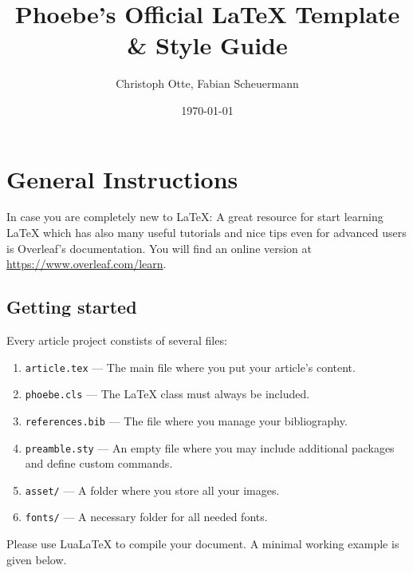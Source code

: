 \documentclass[language=english]{phoebe}
\title{Phoebe's Official LaTeX Template \& Style Guide}
\author{Christoph Otte, Fabian Scheuermann}
\date{\today}
\begin{document}

\maketitle


\section{General Instructions}

In case you are completely new to LaTeX: A great resource for start learning LaTeX which has also many useful tutorials and nice tips even for advanced users is Overleaf's documentation. You will find an online version at \url{https://www.overleaf.com/learn}.

\subsection{Getting started}

Every article project constists of several files:
\begin{enumerate}
\item \lstinline{article.tex} --- The main file where you put your article's content. 
\item \lstinline{phoebe.cls} --- The LaTeX class must always be included.
\item \lstinline{references.bib} --- The file where you manage your bibliography.
\item \lstinline{preamble.sty} --- An empty file where you may include additional packages and define custom commands.
\item \lstinline{asset/} --- A folder where you store all your images.
\item \lstinline{fonts/} --- A necessary folder for all needed fonts.
\end{enumerate}

\noindent Please use LuaLaTeX to compile your document. A minimal working example is given below.
\end{document}
